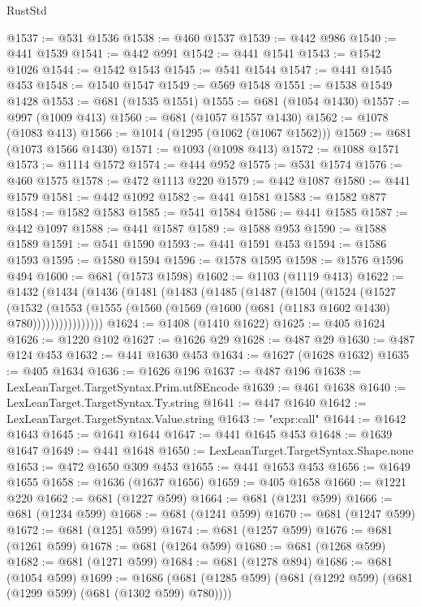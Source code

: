 \begin{lexlean}{RustStd}
\begin{coremodule}
@1537 := @531 @1536
@1538 := @460 @1537
@1539 := @442 @986
@1540 := @441 @1539
@1541 := @442 @991
@1542 := @441 @1541
@1543 := @1542 @1026
@1544 := @1542 @1543
@1545 := @541 @1544
@1547 := @441 @1545 @453
@1548 := @1540 @1547
@1549 := @569 @1548
@1551 := @1538 @1549 @1428
@1553 := @681 (@1535 @1551)
@1555 := @681 (@1054 @1430)
@1557 := @997 (@1009 @413)
@1560 := @681 (@1057 @1557 @1430)
@1562 := @1078 (@1083 @413)
@1566 := @1014 (@1295 (@1062 (@1067 @1562)))
@1569 := @681 (@1073 @1566 @1430)
@1571 := @1093 (@1098 @413)
@1572 := @1088 @1571
@1573 := @1114 @1572
@1574 := @444 @952
@1575 := @531 @1574
@1576 := @460 @1575
@1578 := @472 @1113 @220
@1579 := @442 @1087
@1580 := @441 @1579
@1581 := @442 @1092
@1582 := @441 @1581
@1583 := @1582 @877
@1584 := @1582 @1583
@1585 := @541 @1584
@1586 := @441 @1585
@1587 := @442 @1097
@1588 := @441 @1587
@1589 := @1588 @953
@1590 := @1588 @1589
@1591 := @541 @1590
@1593 := @441 @1591 @453
@1594 := @1586 @1593
@1595 := @1580 @1594
@1596 := @1578 @1595
@1598 := @1576 @1596 @494
@1600 := @681 (@1573 @1598)
@1602 := @1103 (@1119 @413)
@1622 := @1432
    (@1434
      (@1436
        (@1481
          (@1483
            (@1485
              (@1487
                (@1504
                  (@1524
                    (@1527
                      (@1532
                        (@1553
                          (@1555 (@1560 (@1569 (@1600 (@681 (@1183 @1602 @1430) @780))))))))))))))))
@1624 := @1408 (@1410 @1622)
@1625 := @405 @1624
@1626 := @1220 @102
@1627 := @1626 @29
@1628 := @487 @29
@1630 := @487 @124 @453
@1632 := @441 @1630 @453
@1634 := @1627 (@1628 @1632)
@1635 := @405 @1634
@1636 := @1626 @196
@1637 := @487 @196
@1638 := LexLeanTarget.TargetSyntax.Prim.utf8Encode
@1639 := @461 @1638
@1640 := LexLeanTarget.TargetSyntax.Ty.string
@1641 := @447 @1640
@1642 := LexLeanTarget.TargetSyntax.Value.string
@1643 := "expr:call"
@1644 := @1642 @1643
@1645 := @1641 @1644
@1647 := @441 @1645 @453
@1648 := @1639 @1647
@1649 := @441 @1648
@1650 := LexLeanTarget.TargetSyntax.Shape.none
@1653 := @472 @1650 @309 @453
@1655 := @441 @1653 @453
@1656 := @1649 @1655
@1658 := @1636 (@1637 @1656)
@1659 := @405 @1658
@1660 := @1221 @220
@1662 := @681 (@1227 @599)
@1664 := @681 (@1231 @599)
@1666 := @681 (@1234 @599)
@1668 := @681 (@1241 @599)
@1670 := @681 (@1247 @599)
@1672 := @681 (@1251 @599)
@1674 := @681 (@1257 @599)
@1676 := @681 (@1261 @599)
@1678 := @681 (@1264 @599)
@1680 := @681 (@1268 @599)
@1682 := @681 (@1271 @599)
@1684 := @681 (@1278 @894)
@1686 := @681 (@1054 @599)
@1699 := @1686 (@681 (@1285 @599) (@681 (@1292 @599) (@681 (@1299 @599) (@681 (@1302 @599) @780))))

\end{coremodule}
\end{lexlean}
